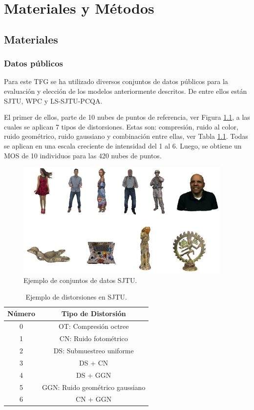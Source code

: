 \chapter{Materiales y Métodos}
\section{Materiales}
\subsection{Datos públicos} 
\label{sec:DatosPublicos}
Para este TFG se ha utilizado diversos conjuntos de datos públicos para la 
evaluación y elección de los modelos anteriormente descritos. De entre ellos 
están SJTU\cite{SJTU}, WPC\cite{WPC1,WPC2} y LS-SJTU-PCQA\cite{ResSCNN}.

El primer de ellos, parte de 10 nubes de puntos de referencia, ver Figura \ref{fig:SJTU}, 
a las cuales se aplican 7 tipos de distorsiones. Estas son: compresión, ruido 
al color, ruido geométrico, ruido gaussiano y combinación entre ellas, ver Tabla \ref{tab:SJTU}. Todas se aplican en una escala creciente
de intensidad del 1 al 6. Luego, se obtiene un MOS de 10 individuos para las 420 
nubes de puntos. 

\begin{figure}[htp]
  \centering 
    \includegraphics[width=0.95\textwidth]{imagenes/chapter4/SJTU}
    \caption{Ejemplo de conjuntos de datos SJTU\cite{SJTU}.}
    \label{fig:SJTU}
\end{figure}

\begin{table}[htp]
  \centering 
  \scriptsize
  \begin{tabular}{|c|c|}
    \hline
    \rowcolor[HTML]{FFC702}
    \textbf{Número} & \textbf{Tipo de Distorsión} \\ 
    \hline 
    0 & OT: Compresión octree\cite{OctreeCompression} \\ 
    \hline 
    1 & CN: Ruido fotométrico\\ 
    \hline 
    2 & DS: Submuestreo uniforme \\
    \hline 
    3 & DS + CN \\
    \hline 
    4 & DS + GGN \\
    \hline 
    5 & GGN: Ruido geométrico gaussiano \\
    \hline 
    6 & CN + GGN \\ 
    \hline 
  \end{tabular}
  \caption{Ejemplo de distorsiones en SJTU\cite{SJTU}.}
  \label{tab:SJTU}
\end{table}

